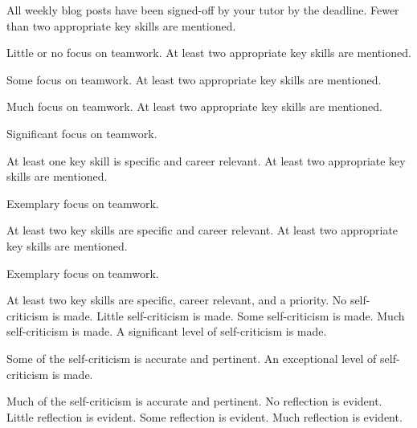 \documentclass{../fal_assignment}
\begin{document}
\begin{markingrubric}
%
        \grade 		All weekly blog posts have been signed-off by your tutor by the deadline.
%
        \grade\fail 	Fewer than two appropriate key skills are mentioned.
        \par 		Little or no focus on teamwork.
        \grade 		At least two appropriate key skills are mentioned.
        \par 		Some focus on teamwork.
        \grade 		At least two appropriate key skills are mentioned.
        \par 		Much focus on teamwork.        
        \grade 		At least two appropriate key skills are mentioned.
        \par 		Significant focus on teamwork.    
        \par 		At least one key skill is specific and career relevant.
        \grade 		At least two appropriate key skills are mentioned.
        \par 		Exemplary focus on teamwork.   
        \par 		At least two key skills are specific and career relevant.
        \grade 		At least two appropriate key skills are mentioned.
        \par 		Exemplary focus on teamwork.   
        \par 		At least two key skills are specific, career relevant, and a priority.
%
        \grade\fail 	No self-criticism is made.
        \grade 		Little self-criticism is made.
        \grade 		Some self-criticism is made.
        \grade 		Much self-criticism is made.
        \grade 		A significant level of self-criticism is made.
            \par 		Some of the self-criticism is accurate and pertinent.
        \grade 		An exceptional level of self-criticism is made.
            \par 		Much of the self-criticism is accurate and pertinent.
%
        \grade\fail 	No reflection is evident.
        \grade 		Little reflection is evident.
        \grade 		Some reflection is evident.
        \grade 		Much reflection is evident.

\end{markingrubric}
\end{document}
